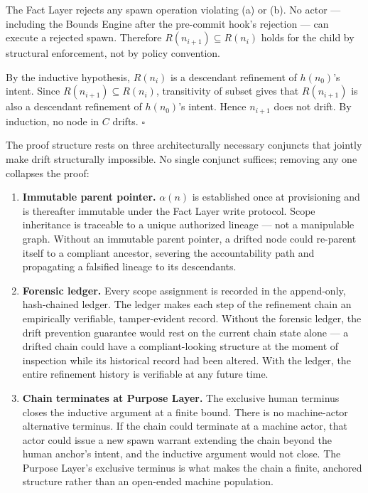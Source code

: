 The Fact Layer rejects any spawn operation violating (a) or (b). No actor — including the Bounds Engine after the pre-commit hook's rejection — can execute a rejected spawn. Therefore $R(n_{i+1}) \subseteq R(n_i)$ holds for the child by structural enforcement, not by policy convention.

By the inductive hypothesis, $R(n_i)$ is a descendant refinement of $h(n_0)$'s intent. Since $R(n_{i+1}) \subseteq R(n_i)$, transitivity of subset gives that $R(n_{i+1})$ is also a descendant refinement of $h(n_0)$'s intent. Hence $n_{i+1}$ does not drift. By induction, no node in $C$ drifts. $\square$

\medskip
The proof structure rests on three architecturally necessary conjuncts that jointly make drift structurally impossible. No single conjunct suffices; removing any one collapses the proof:

\begin{enumerate}
    \item[(1)] \textbf{Immutable parent pointer.} $\alpha(n)$ is established once at provisioning and is thereafter immutable under the Fact Layer write protocol. Scope inheritance is traceable to a unique authorized lineage — not a manipulable graph. Without an immutable parent pointer, a drifted node could re-parent itself to a compliant ancestor, severing the accountability path and propagating a falsified lineage to its descendants.

    \item[(2)] \textbf{Forensic ledger.} Every scope assignment is recorded in the append-only, hash-chained ledger. The ledger makes each step of the refinement chain an empirically verifiable, tamper-evident record. Without the forensic ledger, the drift prevention guarantee would rest on the current chain state alone — a drifted chain could have a compliant-looking structure at the moment of inspection while its historical record had been altered. With the ledger, the entire refinement history is verifiable at any future time.

    \item[(3)] \textbf{Chain terminates at Purpose Layer.} The exclusive human terminus closes the inductive argument at a finite bound. There is no machine-actor alternative terminus. If the chain could terminate at a machine actor, that actor could issue a new spawn warrant extending the chain beyond the human anchor's intent, and the inductive argument would not close. The Purpose Layer's exclusive terminus is what makes the chain a finite, anchored structure rather than an open-ended machine population.
\end{enumerate}

